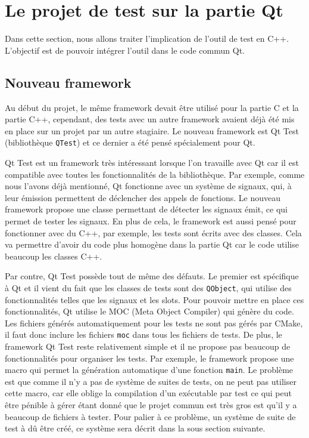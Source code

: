 \documentclass[a4paper]{article}
\begin{document}
\section{Le projet de test sur la partie Qt}%

Dans cette section, nous allons traiter l'implication de l'outil de test en
C++. L'objectif est de pouvoir intégrer l'outil dans le code commun Qt.

\subsection{Nouveau framework}
\label{nouvframe}

Au début du projet, le même framework devait être utilisé pour la partie C et la
partie C++, cependant, des tests avec un autre framework avaient déjà été mis en
place sur un projet par un autre stagiaire. Le nouveau framework est Qt Test
(bibliothèque \verb|QTest|) et ce dernier a été pensé spécialement pour Qt.

Qt Test est un framework très intéressant lorsque l'on travaille avec Qt car il
est compatible avec toutes les fonctionnalités de la bibliothèque. Par exemple,
comme nous l'avons déjà mentionné, Qt fonctionne avec un système de signaux,
qui, à leur émission permettent de déclencher des appels de fonctions. Le
nouveau framework propose une classe permettant de détecter les signaux émit, ce
qui permet de tester les signaux. En plus de cela, le framework est aussi pensé
pour fonctionner avec du C++, par exemple, les tests sont écrits avec des
classes. Cela va permettre d'avoir du code plus homogène dans la partie Qt car
le code utilise beaucoup les classes C++.

Par contre, Qt Test possède tout de même des défauts. Le premier est spécifique
à Qt et il vient du fait que les classes de tests sont des \verb|QObject|, qui
utilise des fonctionnalités telles que les signaux et les \gls{slots}. Pour
pouvoir mettre en place ces fonctionnalités, Qt utilise le MOC (Meta Object
Compiler) qui génère du code. Les fichiers générés automatiquement pour les
tests ne sont pas gérés par CMake, il faut donc inclure les fichiers \verb|moc|
dans tous les fichiers de tests. De plus, le framework Qt Test reste
relativement simple et il ne propose pas beaucoup de fonctionnalités pour
organiser les tests. Par exemple, le framework propose une macro qui permet la
génération automatique d'une fonction \verb|main|. Le problème est que comme il
n'y a pas de système de suites de tests, on ne peut pas utiliser cette macro, car
elle oblige la compilation d'un exécutable par test ce qui peut être pénible à
gérer étant donné que le projet commun est très gros est qu'il y a beaucoup de
fichiers à tester. Pour palier à ce problème, un système de suite de test à dû
être créé, ce système sera décrit dans la sous section suivante.
\end{document}
